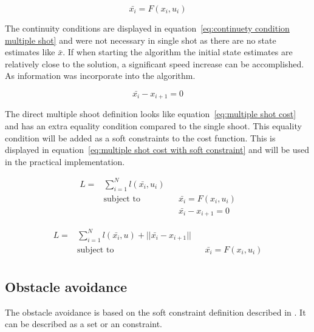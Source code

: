 			\begin{equation}
				\bar{x_i} = F(x_i,u_i)
				\label{eq:}
			\end{equation}
			
			The continuity conditions are displayed in equation~\ref{eq:continuety condition multiple shot} and were not necessary in single shot as there are no state estimates like $\bar{x}$. If when starting the algorithm the initial state estimates are relatively close to the solution, a significant speed increase can be accomplished. As information was incorporate into the algorithm.
			
			\begin{equation}
				\bar{x_i} - x_{i+1} = 0
				\label{eq:continuety condition multiple shot}
			\end{equation}
			
			The direct multiple shoot definition looks like equation~\ref{eq:multiple shot cost} and has an extra equality condition compared to the single shoot. This equality condition will be added as a soft constraints to the cost function. This is displayed in equation~\ref{eq:multiple shot cost with soft constraint} and will be used in the practical implementation.
			
			\begin{equation}
				\begin{aligned}
				L =  & \sum_{i=1}^{N} l(\bar{x_i},u_i) \\
				& \text{subject to}			&& \bar{x_i} = F(x_i,u_i) \\
				& 							&& \bar{x_i} - x_{i+1} = 0
				\end{aligned}
				\label{eq:multiple shot cost}
			\end{equation}
			
			\begin{equation}
			\begin{aligned}
			L =  & \sum_{i=1}^{N} l(\bar{x_i},u) + ||\bar{x_i} - x_{i+1}||\\
			& \text{subject to}			&& \bar{x_i} = F(x_i,u_i) \\
			\end{aligned}
			\label{eq:multiple shot cost with soft constraint}
			\end{equation}
			
		\subsection{Obstacle avoidance}
			The obstacle avoidance is based on the soft constraint definition described in \cite{AjaySathya2017}. It can be described as a set or an constraint.
